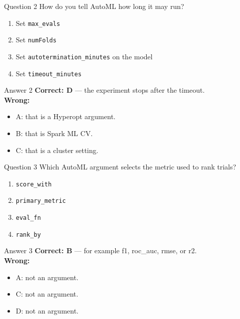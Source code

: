 \documentclass[aspectratio=169,11pt]{beamer}
\begin{document}
\begin{frame}{Question 2}
How do you tell AutoML how long it may run?
\begin{enumerate}[label=\Alph*.]
\item Set \texttt{max\_evals}
\item Set \texttt{numFolds}
\item Set \texttt{autotermination\_minutes} on the model
\item Set \texttt{timeout\_minutes}
\end{enumerate}
\end{frame}
\begin{frame}{Answer 2}
\textbf{Correct: D} --- the experiment stops after the timeout.\\
\vspace{0.5em}
\textbf{Wrong:}
\begin{itemize}
\item A: that is a Hyperopt argument.
\item B: that is Spark ML CV.
\item C: that is a cluster setting.
\end{itemize}
\end{frame}

\begin{frame}{Question 3}
Which AutoML argument selects the metric used to rank trials?
\begin{enumerate}[label=\Alph*.]
\item \texttt{score\_with}
\item \texttt{primary\_metric}
\item \texttt{eval\_fn}
\item \texttt{rank\_by}
\end{enumerate}
\end{frame}
\begin{frame}{Answer 3}
\textbf{Correct: B} --- for example f1, roc\_auc, rmse, or r2.\\
\vspace{0.5em}
\textbf{Wrong:}
\begin{itemize}
\item A: not an argument.
\item C: not an argument.
\item D: not an argument.
\end{itemize}
\end{frame}
\end{document}

